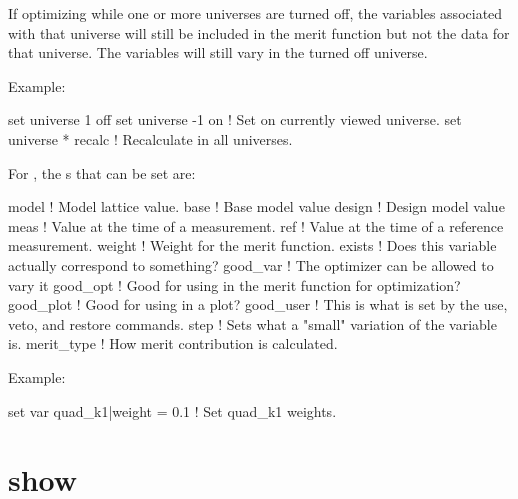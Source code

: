 {{{\begin{description}
If optimizing while one or more universes are turned off, the
variables associated with that universe will still be included in the
merit function but not the data for that universe. The variables will
still vary in the turned off universe.

Example:
\begin{example}
  set universe 1 off
  set universe -1 on    ! Set on currently viewed universe.
  set universe * recalc ! Recalculate in all universes.
\end{example}


  \item[set var <var\_name>|<component> = <value>] \Newline

For , the s that can be set are:
\begin{example}
  model       ! Model lattice value.
  base        ! Base model value
  design      ! Design model value
  meas        ! Value at the time of a measurement.
  ref         ! Value at the time of a reference measurement.
  weight      ! Weight for the merit function.
  exists      ! Does this variable actually correspond to something?
  good_var    ! The optimizer can be allowed to vary it
  good_opt    ! Good for using in the merit function for optimization?
  good_plot   ! Good for using in a plot?
  good_user   ! This is what is set by the use, veto, and restore commands.
  step        ! Sets what a "small" variation of the variable is.
  merit_type  ! How merit contribution is calculated.
\end{example}

Example:
\begin{example}
  set var quad\_k1|weight = 0.1         ! Set quad\_k1 weights. 
\end{example}

\end{description}

\section{show}
\label{s:show}

}}}
